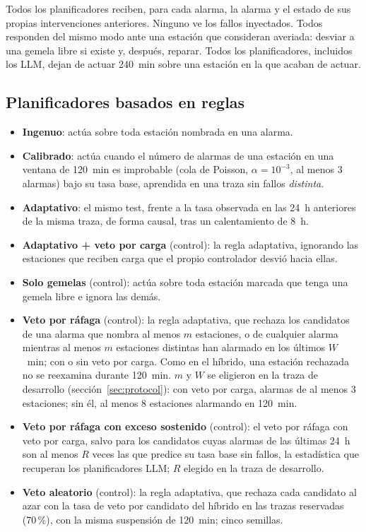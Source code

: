 \documentclass[preprint,11pt]{elsarticle}
\begin{document}
Todos los planificadores reciben, para cada alarma, la alarma y el estado de sus propias intervenciones anteriores. Ninguno ve los fallos inyectados. Todos responden del mismo modo ante una estación que consideran averiada: desviar a una gemela libre si existe y, después, reparar. Todos los planificadores, incluidos los LLM, dejan de actuar 240~min sobre una estación en la que acaban de actuar.

\subsection{Planificadores basados en reglas}
\begin{itemize}
  \item \textbf{Ingenuo}: actúa sobre toda estación nombrada en una alarma.
  \item \textbf{Calibrado}: actúa cuando el número de alarmas de una estación en una ventana de 120~min es improbable (cola de Poisson, $\alpha=10^{-3}$, al menos 3 alarmas) bajo su tasa base, aprendida en una traza sin fallos \emph{distinta}.
  \item \textbf{Adaptativo}: el mismo test, frente a la tasa observada en las 24~h anteriores de la misma traza, de forma causal, tras un calentamiento de 8~h.
  \item \textbf{Adaptativo + veto por carga} (control): la regla adaptativa, ignorando las estaciones que reciben carga que el propio controlador desvió hacia ellas.
  \item \textbf{Solo gemelas} (control): actúa sobre toda estación marcada que tenga una gemela libre e ignora las demás.
  \item \textbf{Veto por ráfaga} (control): la regla adaptativa, que rechaza los candidatos de una alarma que nombra al menos $m$ estaciones, o de cualquier alarma mientras al menos $m$ estaciones distintas han alarmado en los últimos $W$~min; con o sin veto por carga. Como en el híbrido, una estación rechazada no se reexamina durante 120~min. $m$ y $W$ se eligieron en la traza de desarrollo (sección~\ref{sec:protocol}): con veto por carga, alarmas de al menos 3 estaciones; sin él, al menos 8 estaciones alarmando en 120~min.
  \item \textbf{Veto por ráfaga con exceso sostenido} (control): el veto por ráfaga con veto por carga, salvo para los candidatos cuyas alarmas de las últimas 24~h son al menos $R$ veces las que predice su tasa base sin fallos, la estadística que recuperan los planificadores LLM; $R$ elegido en la traza de desarrollo.
  \item \textbf{Veto aleatorio} (control): la regla adaptativa, que rechaza cada candidato al azar con la tasa de veto por candidato del híbrido en las trazas reservadas (70\,\%), con la misma suspensión de 120~min; cinco semillas.
\end{itemize}
\end{document}
